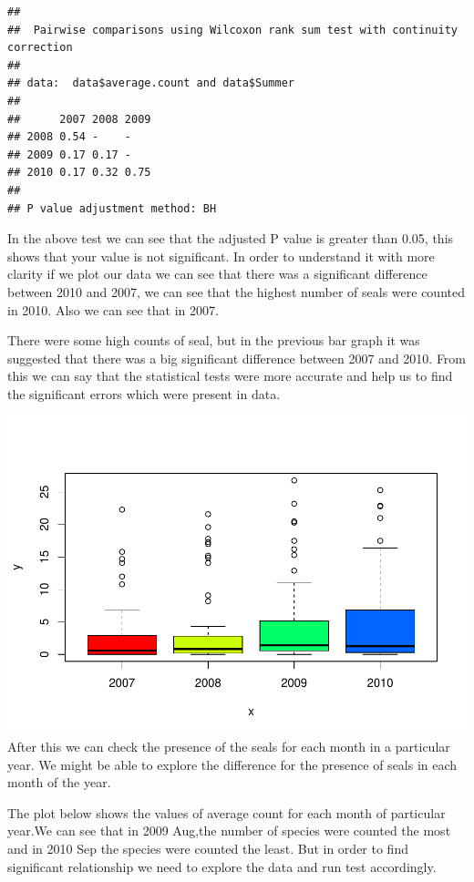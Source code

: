 \documentclass[
]{article}
\begin{document}
\begin{verbatim}
## 
##  Pairwise comparisons using Wilcoxon rank sum test with continuity correction 
## 
## data:  data$average.count and data$Summer 
## 
##      2007 2008 2009
## 2008 0.54 -    -   
## 2009 0.17 0.17 -   
## 2010 0.17 0.32 0.75
## 
## P value adjustment method: BH
\end{verbatim}

In the above test we can see that the adjusted P value is greater than
0.05, this shows that your value is not significant. In order to
understand it with more clarity if we plot our data we can see that
there was a significant difference between 2010 and 2007, we can see
that the highest number of seals were counted in 2010. Also we can see
that in 2007.

There were some high counts of seal, but in the previous bar graph it
was suggested that there was a big significant difference between 2007
and 2010. From this we can say that the statistical tests were more
accurate and help us to find the significant errors which were present
in data.

\includegraphics{Statistical-analysis-in-RStudio_files/figure-latex/unnamed-chunk-11-1.pdf}
After this we can check the presence of the seals for each month in a
particular year. We might be able to explore the difference for the
presence of seals in each month of the year.

The plot below shows the values of average count for each month of
particular year.We can see that in 2009 Aug,the number of species were
counted the most and in 2010 Sep the species were counted the least. But
in order to find significant relationship we need to explore the data
and run test accordingly.
\end{document}
